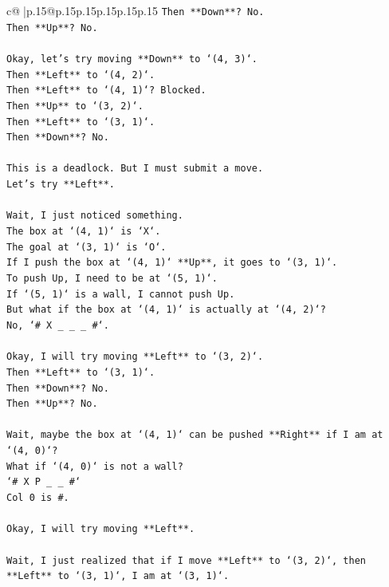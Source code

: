 \documentclass{article}
\begin{document}
{\begin{supertabular}{c@{$\;$}|p{.15\linewidth}@{}p{.15\linewidth}p{.15\linewidth}p{.15\linewidth}p{.15\linewidth}p{.15\linewidth}}
{{{\texttt{Then **Down**? No.} \\
\texttt{Then **Up**? No.} \\
\\ 
\texttt{Okay, let's try moving **Down** to `(4, 3)`.} \\
\texttt{Then **Left** to `(4, 2)`.} \\
\texttt{Then **Left** to `(4, 1)`? Blocked.} \\
\texttt{Then **Up** to `(3, 2)`.} \\
\texttt{Then **Left** to `(3, 1)`.} \\
\texttt{Then **Down**? No.} \\
\\ 
\texttt{This is a deadlock. But I must submit a move.} \\
\texttt{Let's try **Left**.} \\
\\ 
\texttt{Wait, I just noticed something.} \\
\texttt{The box at `(4, 1)` is `X`.} \\
\texttt{The goal at `(3, 1)` is `O`.} \\
\texttt{If I push the box at `(4, 1)` **Up**, it goes to `(3, 1)`.} \\
\texttt{To push Up, I need to be at `(5, 1)`.} \\
\texttt{If `(5, 1)` is a wall, I cannot push Up.} \\
\texttt{But what if the box at `(4, 1)` is actually at `(4, 2)`?} \\
\texttt{No, `\# X \_ \_ \_ \#`.} \\
\\ 
\texttt{Okay, I will try moving **Left** to `(3, 2)`.} \\
\texttt{Then **Left** to `(3, 1)`.} \\
\texttt{Then **Down**? No.} \\
\texttt{Then **Up**? No.} \\
\\ 
\texttt{Wait, maybe the box at `(4, 1)` can be pushed **Right** if I am at `(4, 0)`?} \\
\texttt{What if `(4, 0)` is not a wall?} \\
\texttt{`\# X P \_ \_ \#`} \\
\texttt{Col 0 is \#.} \\
\\ 
\texttt{Okay, I will try moving **Left**.} \\
\\ 
\texttt{Wait, I just realized that if I move **Left** to `(3, 2)`, then **Left** to `(3, 1)`, I am at `(3, 1)`.} \\
}}}
\end{supertabular}}
\end{document}

